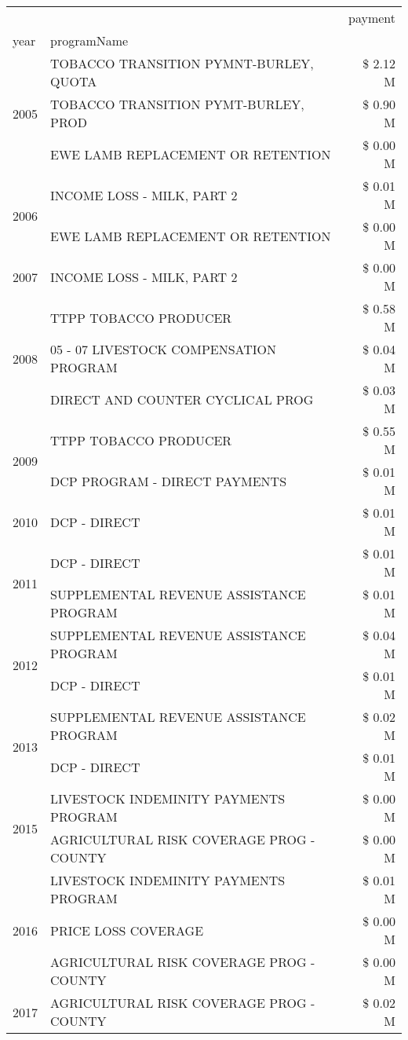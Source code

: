 \begin{tabular}{llr}
\toprule
 &  & payment \\
year & programName &  \\
\midrule
\multirow[t]{3}{*}{2005} & TOBACCO TRANSITION PYMNT-BURLEY, QUOTA & \$ 2.12 M \\
 & TOBACCO TRANSITION PYMT-BURLEY, PROD & \$ 0.90 M \\
 & EWE LAMB REPLACEMENT OR RETENTION & \$ 0.00 M \\
\cline{1-3}
\multirow[t]{2}{*}{2006} & INCOME LOSS - MILK, PART 2 & \$ 0.01 M \\
 & EWE LAMB REPLACEMENT OR RETENTION & \$ 0.00 M \\
\cline{1-3}
2007 & INCOME LOSS - MILK, PART 2 & \$ 0.00 M \\
\cline{1-3}
\multirow[t]{3}{*}{2008} & TTPP TOBACCO PRODUCER & \$ 0.58 M \\
 & 05 - 07 LIVESTOCK COMPENSATION PROGRAM & \$ 0.04 M \\
 & DIRECT AND COUNTER CYCLICAL PROG & \$ 0.03 M \\
\cline{1-3}
\multirow[t]{2}{*}{2009} & TTPP TOBACCO PRODUCER & \$ 0.55 M \\
 & DCP PROGRAM - DIRECT PAYMENTS & \$ 0.01 M \\
\cline{1-3}
2010 & DCP - DIRECT & \$ 0.01 M \\
\cline{1-3}
\multirow[t]{2}{*}{2011} & DCP - DIRECT & \$ 0.01 M \\
 & SUPPLEMENTAL REVENUE ASSISTANCE PROGRAM & \$ 0.01 M \\
\cline{1-3}
\multirow[t]{2}{*}{2012} & SUPPLEMENTAL REVENUE ASSISTANCE PROGRAM & \$ 0.04 M \\
 & DCP - DIRECT & \$ 0.01 M \\
\cline{1-3}
\multirow[t]{2}{*}{2013} & SUPPLEMENTAL REVENUE ASSISTANCE PROGRAM & \$ 0.02 M \\
 & DCP - DIRECT & \$ 0.01 M \\
\cline{1-3}
\multirow[t]{2}{*}{2015} & LIVESTOCK INDEMINITY PAYMENTS PROGRAM & \$ 0.00 M \\
 & AGRICULTURAL RISK COVERAGE PROG - COUNTY & \$ 0.00 M \\
\cline{1-3}
\multirow[t]{3}{*}{2016} & LIVESTOCK INDEMINITY PAYMENTS PROGRAM & \$ 0.01 M \\
 & PRICE LOSS COVERAGE & \$ 0.00 M \\
 & AGRICULTURAL RISK COVERAGE PROG - COUNTY & \$ 0.00 M \\
\cline{1-3}
\multirow[t]{3}{*}{2017} & AGRICULTURAL RISK COVERAGE PROG - COUNTY & \$ 0.02 M \\

\end{tabular}
